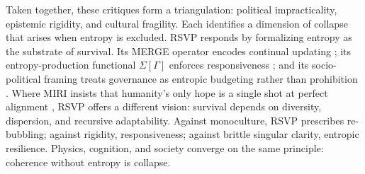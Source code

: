 \documentclass[12pt]{article}
\begin{document}
Taken together, these critiques form a triangulation: political impracticality, epistemic rigidity, and cultural fragility. Each identifies a dimension of collapse that arises when entropy is excluded. RSVP responds by formalizing entropy as the substrate of survival. Its MERGE operator encodes continual updating \citep{lurie2009higher}; its entropy-production functional $\Sigma[\Gamma]$ enforces responsiveness \citep{verlinde2011entropic}; and its socio-political framing treats governance as entropic budgeting rather than prohibition \citep{landauer1961irreversibility}. Where MIRI insists that humanity’s only hope is a single shot at perfect alignment \citep{yudkowsky2025IABIED}, RSVP offers a different vision: survival depends on diversity, dispersion, and recursive adaptability. Against monoculture, RSVP prescribes re-bubbling; against rigidity, responsiveness; against brittle singular clarity, entropic resilience. Physics, cognition, and society converge on the same principle: coherence without entropy is collapse.



\end{document}
